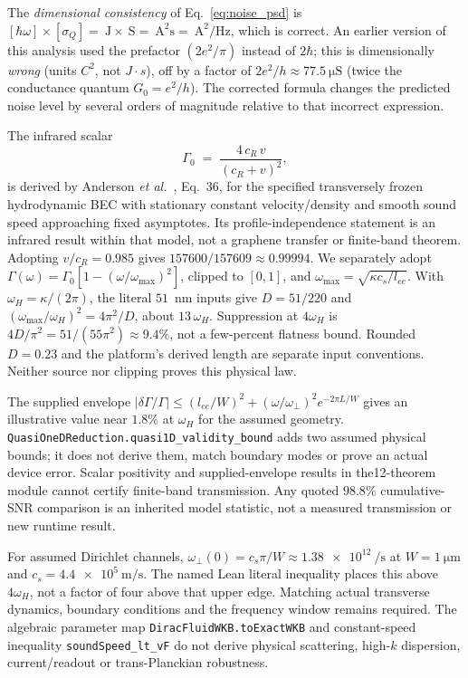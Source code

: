 \documentclass[aps,prd,twocolumn,showpacs,superscriptaddress,nofootinbib]{revtex4-2}
\begin{document}
The \emph{dimensional consistency} of Eq.~\eqref{eq:noise_psd} is
$[\hbar\omega]\times[\sigma_Q] = \SI{}{\joule}\times\SI{}{\siemens} =
\SI{}{\ampere\squared\second} = \SI{}{\ampere\squared/\hertz}$, which
is correct.
An earlier version of this analysis used the prefactor $(2e^2/\pi)$
instead of $2\hbar$; this is dimensionally \emph{wrong} (units $C^2$,
not $J{\cdot}s$), off by a factor of $2e^2/h \approx \SI{77.5}{\micro\siemens}$
(twice the conductance quantum $G_0 = e^2/h$). The corrected formula changes the predicted
noise level by several orders of magnitude relative to that incorrect
expression.

The infrared scalar
\begin{equation}
\Gamma_0 \;=\; \frac{4\,c_R\,v}{(c_R + v)^2},
\label{eq:gamma0}
\end{equation}
is derived by Anderson \emph{et al.}~\cite{AndersonBFP2014Graybody},
Eq.~36, for the specified transversely frozen hydrodynamic BEC with
stationary constant velocity/density and smooth sound speed approaching
fixed asymptotes.
Its profile-independence statement is an infrared result within that
model, not a graphene transfer or finite-band theorem. Adopting
$v/c_R=0.985$ gives $157600/157609\approx0.99994$.
We separately adopt $\Gamma(\omega)=\Gamma_0[1-(\omega/\omega_{\max})^2]$,
clipped to $[0,1]$, and $\omega_{\max}=\sqrt{\kappa c_s/l_{ee}}$.
With $\omega_H=\kappa/(2\pi)$, the literal $51$~nm inputs give
$D=51/220$ and $(\omega_{\max}/\omega_H)^2=4\pi^2/D$, about
$13\,\omega_H$. Suppression at $4\omega_H$ is
$4D/\pi^2=51/(55\pi^2)\approx9.4\%$, not a few-percent flatness
bound. Rounded $D=0.23$ and the platform's derived length are separate
input conventions. Neither source nor clipping proves this physical law.

The supplied envelope
$|\delta\Gamma/\Gamma|\le(l_{ee}/W)^2+(\omega/\omega_\perp)^2e^{-2\pi L/W}$
gives an illustrative value near $1.8\%$ at $\omega_H$ for the assumed
geometry. \texttt{QuasiOneDReduction.quasi1D\_validity\_bound} adds two
assumed physical bounds; it does not derive them, match boundary modes or
prove an actual device error. Scalar positivity and supplied-envelope
results in the12-theorem module cannot certify finite-band transmission.
Any quoted $98.8\%$ cumulative-SNR comparison is an inherited model
statistic, not a measured transmission or new runtime result.

For assumed Dirichlet channels, $\omega_\perp(0)=c_s\pi/W\approx
\SI{1.38e12}{\per\second}$ at $W=\SI{1}{\micro\meter}$ and
$c_s=\SI{4.4e5}{\meter/\second}$. The named Lean literal inequality
places this above $4\omega_H$, not a factor of four above that upper
edge. Matching actual transverse dynamics, boundary conditions and the
frequency window remains required. The algebraic parameter map
\texttt{DiracFluidWKB.toExactWKB} and constant-speed inequality
\texttt{soundSpeed\_lt\_vF} do not derive physical scattering, high-$k$
dispersion, current/readout or trans-Planckian robustness.
\end{document}
